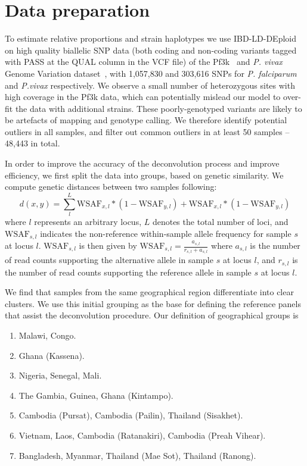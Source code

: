 \documentclass[9pt,lineno]{elife}
\begin{document}

\section{Data preparation}
To estimate relative proportions and strain haplotypes we use IBD-LD-DEploid on high quality biallelic SNP data (both coding and non-coding variants tagged with PASS at the QUAL column in the VCF file) of the Pf3k~\citep{Pf3k2016} and {\it P. vivax} Genome Variation dataset~\citep{Pearson2016}, with 1,057,830 and 303,616 SNPs for {\it P. falciparum} and {\it P.vivax} respectively. We observe a small number of heterozygous sites with high coverage in the Pf3k data, which can potentially mislead our model to over-fit the data with additional strains. These poorly-genotyped variants are likely to be artefacts of mapping and genotype calling. We therefore identify potential outliers in all samples, and filter out common outliers in at least 50 samples -- 48,443 in total.

In order to improve the accuracy of the deconvolution process and improve efficiency, we first split the  data into groups, based on genetic similarity. We compute genetic distances between two samples following:
\begin{equation}
d(x, y) = \sum_{l}^{L}\textrm{WSAF}_{x,l} * (1-\textrm{WSAF}_{y,l}) + \textrm{WSAF}_{x,l} * (1-\textrm{WSAF}_{y,l})
\end{equation}
where $l$ represents an arbitrary locus, $L$ denotes the total number of loci, and $\textrm{WSAF}_{s,l}$ indicates the non-reference within-sample allele frequency for sample $s$ at locus $l$. $\textrm{WSAF}_{s,l}$ is then given by $\textrm{WSAF}_{s,l} = \frac{a_{s,l}}{r_{s,l}+a_{s,l}}$ where $a_{s,l}$ is the number of read counts supporting the alternative allele in sample $s$ at locus $l$, and $r_{s,l}$ is the number of read counts supporting the reference allele in sample $s$ at locus $l$.

We find that samples from the same geographical region differentiate into clear clusters. We use this initial grouping as the base for defining the reference panels that assist the deconvolution procedure. Our definition of geographical groups is
\begin{enumerate}
  \item Malawi, Congo.
  \item Ghana (Kassena).
  \item Nigeria, Senegal, Mali.
  \item The Gambia, Guinea, Ghana (Kintampo).
  \item Cambodia (Pursat), Cambodia (Pailin), Thailand (Sisakhet).
  \item Vietnam, Laos, Cambodia (Ratanakiri), Cambodia (Preah Vihear).
  \item Bangladesh, Myanmar, Thailand (Mae Sot), Thailand (Ranong).
\end{enumerate}
\end{document}
